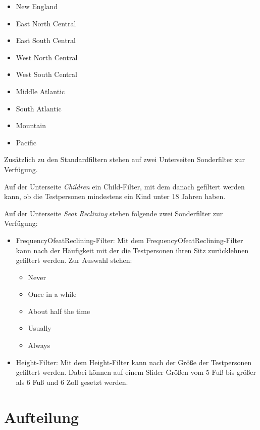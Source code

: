 \documentclass{scrartcl}
\begin{document}
\begin{itemize}
	\begin{itemize}
	\item New England
	\item East North Central
	\item East South Central
	\item West North Central
	\item West South Central
	\item Middle Atlantic
	\item South Atlantic
	\item Mountain
	\item Pacific
	\end{itemize}
\end{itemize}

Zusätzlich zu den Standardfiltern stehen auf zwei Unterseiten Sonderfilter zur Verfügung. 

Auf der Unterseite \textit{Children} ein Child-Filter, mit dem danach gefiltert werden kann, ob die Testpersonen mindestens ein Kind unter 18 Jahren haben. 

Auf der Unterseite \textit{Seat Reclining} stehen folgende zwei Sonderfilter zur Verfügung: 
\begin{itemize}
\item FrequencyOfeatReclining-Filter: Mit dem FrequencyOfeatReclining-Filter kann nach der Häufigkeit mit der die Testpersonen ihren Sitz zurücklehnen gefiltert werden. Zur Auswahl stehen:
	\begin{itemize}
	\item Never
	\item Once in a while
	\item About half the time
	\item Usually
	\item Always
	\end{itemize}
\item Height-Filter: Mit dem Height-Filter kann nach der Größe der Testpersonen gefiltert werden. Dabei können auf einem Slider Größen vom 5 Fuß bis größer als 6 Fuß und 6 Zoll gesetzt werden.
\end{itemize} 

\section{Aufteilung}
\end{document}
